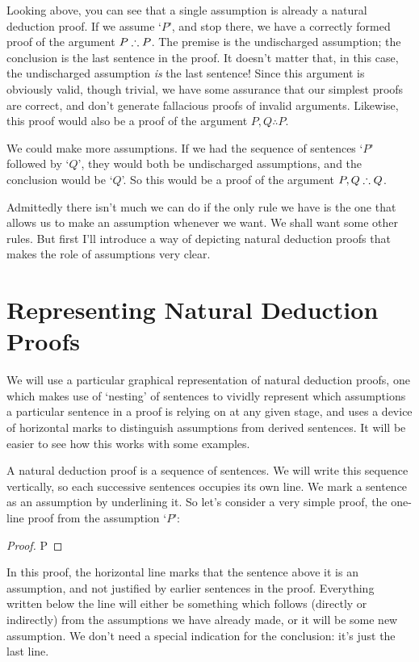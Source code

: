 Looking above, you can see that a single assumption is already a natural deduction proof. If we assume `$P$', and stop there, we have a correctly formed proof of the argument $P \mathrel{\therefore} P$. The premise is the undischarged assumption; the conclusion is the last sentence in the proof. It doesn't matter that, in this case, the undischarged assumption \emph{is} the last sentence! Since this argument is obviously valid, though trivial, we have some assurance that our simplest proofs are correct, and don't generate fallacious proofs of invalid arguments. Likewise, this proof would also be a proof of the argument $P, Q \therefore P$.

We could make more assumptions. If we had the sequence of sentences `$P$' followed by `$Q$', they would both be undischarged assumptions, and the conclusion would be `$Q$'. So this would be a proof of the argument $P, Q \mathrel{\therefore} Q$.

Admittedly there isn't much we can do if the only rule we have is the one that allows us to make an assumption whenever we want. We shall want some other rules. But first I'll introduce a way of depicting natural deduction proofs that makes the role of assumptions very clear.

\section{Representing Natural Deduction Proofs}\label{fitch}


We will use a particular graphical representation of natural deduction proofs, one which makes use of `nesting' of sentences to vividly represent which assumptions a particular sentence in a proof is relying on at any given stage, and uses a device of horizontal marks to distinguish assumptions from derived sentences. It will be easier to see how this works with some examples.

A natural deduction proof is a sequence of sentences. We will write this sequence vertically, so each successive sentences occupies its own line. We mark a sentence as an assumption by underlining it. So let's consider a very simple proof, the one-line proof from the assumption `$P$': \begin{proof}
	 P
\end{proof}
In this proof, the horizontal line marks that the sentence above it is an assumption, and not justified by earlier sentences in the proof. Everything written below the line will either be something which follows (directly or indirectly) from the assumptions we have already made, or it will be some new assumption.  We don't need a special indication for the conclusion: it's just the last line. 

